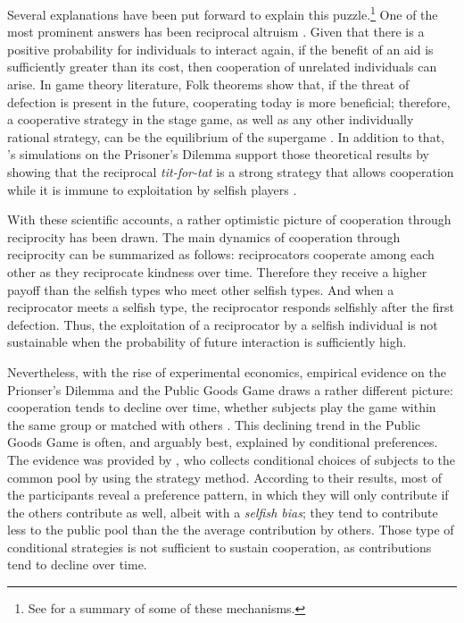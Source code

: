 \documentclass[12pt]{article}
\begin{document}
Several explanations have been put forward to explain this puzzle.\footnote{See \citet{Nowak2006} for a summary of some of these mechanisms.} One of the most prominent answers has been reciprocal altruism \citep{Trivers1971, Axelrod1981-ot, may1987more, nowak1992tit,Nowak1993-gl}. 
Given that there is a positive probability for individuals to interact again, if the benefit of an aid is sufficiently greater than its cost, then cooperation of unrelated individuals can arise. In game theory literature, Folk theorems show that, if the threat of defection is present in the future, cooperating today is more beneficial; therefore, a cooperative strategy in the stage game, as well as any other individually rational strategy, can be the equilibrium of the supergame \citep{Friedman1971-nz, Fudenberg1986-dz}. In addition to that, \citeauthor{Axelrod1980a}'s simulations on the Prisoner's Dilemma  support those theoretical results by showing that the reciprocal \textit{tit-for-tat} is a strong strategy that allows cooperation while it is immune to exploitation by selfish players \citep{Axelrod1980a,Axelrod1980b,Axelrod1981-ot}. 

With these scientific accounts, a rather optimistic picture of cooperation through reciprocity has been drawn. The main dynamics of cooperation through reciprocity can be summarized as follows: reciprocators cooperate among each other as they reciprocate kindness over time. Therefore they receive a higher payoff than the selfish types who meet other selfish types. And when a reciprocator meets a selfish type, the reciprocator responds selfishly after the first defection. Thus, the exploitation of a reciprocator by a selfish individual is not sustainable when the probability of future interaction is sufficiently high. 

Nevertheless, with the rise of experimental economics, empirical evidence on the Prionser's Dilemma and the Public Goods Game draws a rather different picture: cooperation tends to decline over time, whether subjects play the game within the same group or matched with others \citep{Selten1986-uc, Andreoni1993-ys, Cooper1996-be, ledyard1994public, Kim1984-wm, Isaac1985-qz, Andreoni2008-ec}. This declining trend in the Public Goods Game is often, and arguably best, explained by conditional preferences. The evidence was provided by \citet{Fischbacher2001}, who collects conditional choices of subjects to the common pool by using the strategy method. According to their results, most of the participants reveal a preference pattern, in which they will only contribute if the others contribute as well, albeit with a \textit{selfish bias}; they tend to contribute less to the public pool than the the average contribution by others. Those type of conditional strategies is not sufficient to sustain cooperation, as contributions tend to decline over time\citep{Fischbacher2010}.
\end{document}
